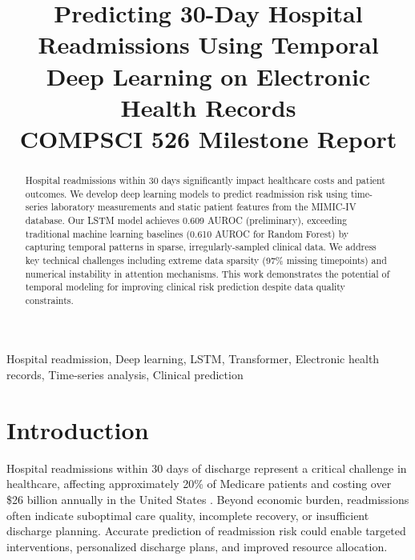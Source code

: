 \documentclass[conference]{IEEEtran}
\begin{document}
\title{Predicting 30-Day Hospital Readmissions Using Temporal Deep Learning on Electronic Health Records\\
{\normalsize COMPSCI 526 Milestone Report}}

\author{
}

\maketitle

\begin{abstract}
Hospital readmissions within 30 days significantly impact healthcare costs and patient outcomes. We develop deep learning models to predict readmission risk using time-series laboratory measurements and static patient features from the MIMIC-IV database. Our LSTM model achieves 0.609 AUROC (preliminary), exceeding traditional machine learning baselines (0.610 AUROC for Random Forest) by capturing temporal patterns in sparse, irregularly-sampled clinical data. We address key technical challenges including extreme data sparsity (97\% missing timepoints) and numerical instability in attention mechanisms. This work demonstrates the potential of temporal modeling for improving clinical risk prediction despite data quality constraints.
\end{abstract}

\begin{IEEEkeywords}
Hospital readmission, Deep learning, LSTM, Transformer, Electronic health records, Time-series analysis, Clinical prediction
\end{IEEEkeywords}

\section{Introduction}

Hospital readmissions within 30 days of discharge represent a critical challenge in healthcare, affecting approximately 20\% of Medicare patients and costing over \$26 billion annually in the United States \cite{jencks2009}. Beyond economic burden, readmissions often indicate suboptimal care quality, incomplete recovery, or insufficient discharge planning. Accurate prediction of readmission risk could enable targeted interventions, personalized discharge plans, and improved resource allocation.
\end{document}
